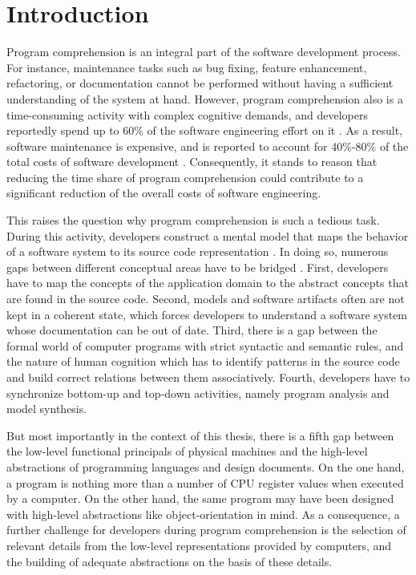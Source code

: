 \chapter{Introduction}
\label{c:introduction}
Program comprehension is an integral part of the software development process.
For instance, maintenance tasks such as bug fixing, feature enhancement, refactoring, or documentation cannot be performed without having a sufficient understanding of the system at hand.
However, program comprehension also is a time-consuming activity with complex cognitive demands, and developers reportedly spend up to 60\% of the software engineering effort on it \cite{corbi_program_1989, basili_evolving_1997, ducasse_class_2005, rothlisberger_feature_2007, cornelissen_execution_2008}.
As a result, software maintenance is expensive, and is reported to account for 40\%-80\% of the total costs of software development \cite{glass_frequently_2001}.
Consequently, it stands to reason that reducing the time share of program comprehension could contribute to a significant reduction of the overall costs of software engineering.

This raises the question why program comprehension is such a tedious task.
During this activity, developers construct a mental model that maps the behavior of a software system to its source code representation \cite{latoza_maintaining_2006}.
In doing so, numerous gaps between different conceptual areas have to be bridged \cite{kent_program_1996}.
First, developers have to map the concepts of the application domain to the abstract concepts that are found in the source code.
Second, models and software artifacts often are not kept in a coherent state, which forces developers to understand a software system whose documentation can be out of date.
Third, there is a gap between the formal world of computer programs with strict syntactic and semantic rules, and the nature of human cognition which has to identify patterns in the source code and build correct relations between them associatively.
Fourth, developers have to synchronize bottom-up and top-down activities, namely program analysis and model synthesis.

But most importantly in the context of this thesis, there is a fifth gap between the low-level functional principals of physical machines and the high-level abstractions of programming languages and design documents.
On the one hand, a program is nothing more than a number of CPU register values when executed by a computer.
On the other hand, the same program may have been designed with high-level abstractions like object-orientation in mind.
As a consequence, a further challenge for developers during program comprehension is the selection of relevant details from the low-level representations provided by computers, and the building of adequate abstractions on the basis of these details.

